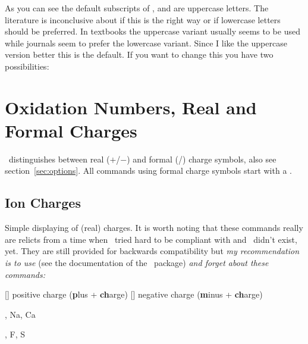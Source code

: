 \documentclass[load-preamble+]{cnltx-doc}
\begin{document}
As you can see the default subscripts of , 
and  are uppercase letters.  The literature is inconclusive about if
this is the right way or if lowercase letters should be preferred.  In
textbooks the uppercase variant usually seems to be used while journals seem
to prefer the lowercase variant.  Since I like the uppercase version better
this is the default.  If you want to change this you have two possibilities:

\begin{example}
  \pKa
\end{example}

\section{Oxidation Numbers, Real and Formal Charges}\label{sec:ladungen}

\chemmacros\ distinguishes between real ($+$/$-$) and formal (\fplus/\fminus)
charge symbols, also see section~\ref{sec:options}.  All commands using formal
charge symbols start with a .

\subsection{Ion Charges}\label{ssec:ionen}

Simple displaying of (real) charges.  It is worth noting that these commands
really are relicts from a time when \chemmacros\ tried hard to be compliant
with  and \chemformula\ didn't exist, yet.  They are still provided
for backwards compatibility but \emph{my recommendation is to use} 
(see the documentation of the \chemformula\ package) \emph{and forget about
  these commands:}
\begin{commands}
  []
    positive charge (\textbf{p}lus + \textbf{ch}arge)
  []
    negative charge (\textbf{m}inus + \textbf{ch}arge)
\end{commands}

\begin{example}
  \leavevmode
  \pch, Na\pch, Ca\pch[2]\par
  \leavevmode
  \mch, F\mch, S\mch[2]
\end{example}
\end{document}
